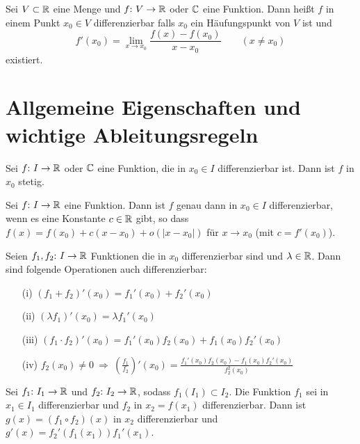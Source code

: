 \begin{frameddefn}
	Sei $V \subset \mathbb{R}$ eine Menge und $f{:}\  V \to \mathbb{R}$ oder $\mathbb{C}$ eine Funktion. Dann heißt $f$ in einem Punkt $x_0 \in V$ differenzierbar falls $x_0$ ein Häufungspunkt von $V$ ist und 
	\[
	f'(x_0) = \lim\limits_{x \to x_0} \frac{f(x) - f(x_0)}{x - x_0} \qquad (x \neq x_0)
	\] 
	existiert.
\end{frameddefn}

\section{Allgemeine Eigenschaften und wichtige Ableitungsregeln}

\begin{framedthm}
	Sei $f{:}\  I \to \mathbb{R}$ oder $\mathbb{C}$ eine Funktion, die in $x_0 \in I$ differenzierbar ist. Dann ist $f$ in $x_0$ stetig.
\end{framedthm}

\begin{framedthm}
	Sei $f{:}\  I \to \mathbb{R}$ eine Funktion. Dann ist $f$ genau dann in $x_0 \in I$ differenzierbar, wenn es eine Konstante $c \in \mathbb{R}$ gibt, so dass $f(x) = f(x_0) + c(x-x_0) + \textit{o}(|x-x_0|)$ für $x \to x_0$ (mit $c=f'(x_0)$).
\end{framedthm}


\begin{framedthm}
	Seien $f_1, f_2 {:}\  I \to \mathbb{R}$ Funktionen die in $x_0$ differenzierbar sind und $\lambda \in \mathbb{R}$. Dann sind folgende Operationen auch differenzierbar:
	\begin{enumerate}
		\item [(i)] $(f_1 + f_2)'(x_0) = f_1'(x_0) + f_2'(x_0)$
		\item [(ii)] $(\lambda f_1)'(x_0) = \lambda f_1 ' (x_0)$
		\item [(iii)] $(f_1 \cdot f_2)'(x_0) = f_1'(x_0) f_2(x_0) + f_1(x_0) f_2'(x_0)$
		\item [(iv)] $f_2(x_0) \neq 0 \ \Rightarrow \ \left(\frac{f_1}{f_2}\right)'(x_0) = \frac{f_1'(x_0) f_2(x_0) - f_1(x_0) f_2'(x_0)}{f_2^2(x_0)}$
	\end{enumerate}
\end{framedthm}


\begin{framedthm}[Kettenregel]
	Sei $f_1{:}\  I_1 \to \mathbb{R}$ und $f_2{:}\  I_2 \to \mathbb{R}$, sodass $f_1(I_1) \subset I_2$. Die Funktion $f_1$ sei in $x_1 \in I_1$ differenzierbar und $f_2$ in $x_2 = f(x_1)$ differenzierbar. Dann ist $g(x) = (f_1 \circ f_2)(x)$ in $x_2$ differenzierbar und $g'(x) = f_2'(f_1(x_1)) f_1'(x_1)$.
\end{framedthm}

